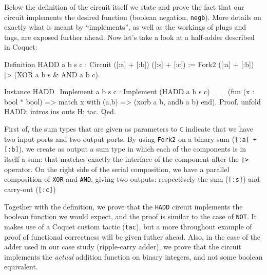 \documentclass[a4paper]{article}
\begin{document}
                Below the definition of the circuit itself we state and prove the fact that our
                circuit implements the desired function (boolean negation, \texttt{negb}). More
                details on exactly what is meant by ``implements'', as well as the workings of plugs
                and tags, are exposed further ahead. Now let's take a look at a half-adder
                described in Coquet:
                \begin{coqcode}
        Definition HADD a b s c : Circuit ([:a] + [:b]) ([:s] + [:c]) :=
            Fork2 ([:a] + [:b]) |> (XOR a b s & AND a b c).

        Instance HADD_Implement {a b s c} :
            Implement (HADD a b s c) _ _
            (fun (x : bool * bool) => match x with (a,b) => (xorb a b, andb a b) end).
            Proof.
                unfold HADD;  intros ins outs H;  tac.
            Qed.
                \end{coqcode}

                First of, the sum types that are given as parameters to \texttt{ℂ} indicate that we
                have two input ports and two output ports. By using \texttt{Fork2} on a binary sum
                (\texttt{[:a] + [:b]}), we create as output a sum type in which each of the
                components is in itself a sum: that matches exactly the interface of the component
                after the \texttt{|>} operator. On the right side of the serial composition, we have
                a parallel composition of \texttt{XOR} and \texttt{AND}, giving two outputs:
                respectively the sum (\texttt{[:s]}) and carry-out (\texttt{[:c]}) 

                Together with the definition, we prove that the \texttt{HADD} circuit implements the
                boolean function we would expect, and the proof is similar to the case of
                \texttt{NOT}. It makes use of a Coquet custom tactic (\texttt{tac}), but a more
                throughout example of proof of functional correctness will be given futher ahead.
                Also, in the case of the adder used in our case study (ripple-carry adder), we prove
                that the circuit implements the \emph{actual} addition function on binary integers,
                and not some boolean equivalent.
\end{document}
